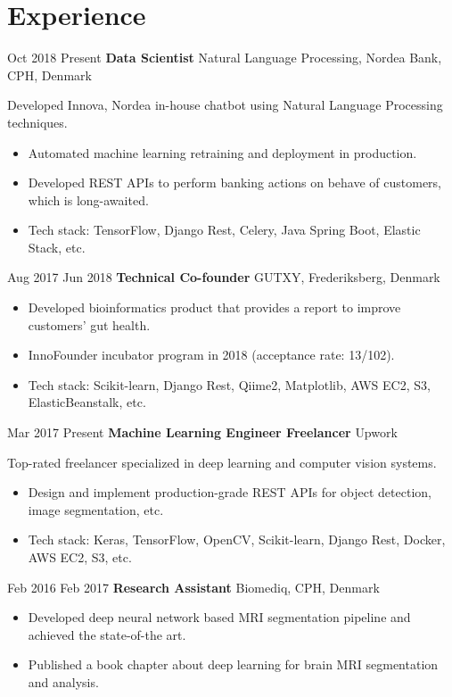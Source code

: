 \documentclass[11pt]{article} %
\begin{document}
{\section{Experience}
\job
{Oct 2018 }{Present}
{\textbf{Data Scientist}}
{}
{Natural Language Processing, Nordea Bank, CPH, Denmark}
{
	Developed Innova, Nordea in-house chatbot using Natural Language Processing techniques.
    \begin{itemize}
    	\itemsep-0.2em
    	\item Automated machine learning retraining and deployment in production.
    	\item Developed REST APIs to perform banking actions on behave of customers, which is long-awaited.
    	\item Tech stack: TensorFlow, Django Rest, Celery, Java Spring Boot, Elastic Stack, etc.
    \end{itemize}
}
\job
{Aug 2017 }{Jun 2018}
{\textbf{Technical Co-founder}}
{}
{GUTXY, Frederiksberg, Denmark}
{
 	\begin{itemize}
		\itemsep-0.2em
		\item Developed bioinformatics product that provides a report to improve customers' gut health.  
		\item InnoFounder incubator program in 2018 (acceptance rate: 13/102).
		\item Tech stack: Scikit-learn, Django Rest, Qiime2, Matplotlib, AWS EC2, S3, ElasticBeanstalk, etc.
	\end{itemize}

}
\job
{Mar 2017 }{Present}
{\textbf{Machine Learning Engineer Freelancer}}
{}
{Upwork}
{
	Top-rated freelancer specialized in deep learning and computer vision systems.
 	\begin{itemize}
		\itemsep-0.2em
		\item Design and implement production-grade REST APIs for object detection, image segmentation, etc.
		\item Tech stack: Keras, TensorFlow, OpenCV, Scikit-learn, Django Rest, Docker, AWS EC2, S3, etc.
	\end{itemize}
}
\job
{Feb 2016 }{Feb 2017}
{\textbf{Research Assistant}}
{}
{Biomediq, CPH, Denmark}
{
 	\begin{itemize}
		\itemsep-0.2em
		\item Developed deep neural network based MRI segmentation pipeline and achieved the state-of-the art.
		\item Published a book chapter about deep learning for brain MRI segmentation and analysis.
	\end{itemize}

}}
\end{document}

